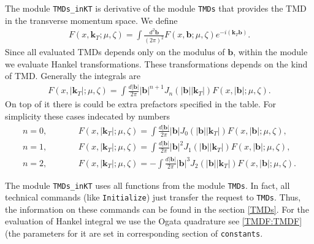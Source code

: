 \documentclass[prd,nofootinbib,eqsecnum,final]{revtex4}
\renewcommand{\(}{\left(}
\renewcommand{\)}{\right)}
\renewcommand{\[}{\left[}
\renewcommand{\]}{\right]}
\renewcommand{\vec}[1]{\bm{#1}}
\begin{document}
The module \texttt{TMDs\_inKT} is derivative of the module \texttt{TMDs} that provides the TMD in the transverse momentum space. We define
\begin{eqnarray}
F(x,\vec k_T;\mu,\zeta)=\int \frac{d^2\vec b}{(2\pi)^2}F(x,\vec b;\mu,\zeta)e^{-i(\vec k_T \vec b)}.
\end{eqnarray}
Since all evaluated TMDs depends only on the modulus of $\vec b$, within the module we evaluate Hankel transformations. These transformations depends on the kind of TMD. Generally the integrals are
\begin{eqnarray}\label{kT-J0}
F(x,|\vec k_T|;\mu,\zeta)=\int \frac{d|\vec b|}{2\pi}|\vec  b|^{n+1} J_n(|\vec b||\vec k_T|) F(x,|\vec b|;\mu,\zeta).
\end{eqnarray}
On top of it there is could be extra prefactors specified in the table. For simplicity these cases indecated by numbers
\begin{eqnarray}
n=0,&\qquad &F(x,|\vec k_T|;\mu,\zeta)=\int \frac{d|\vec b|}{2\pi}|\vec  b| J_0(|\vec b||\vec k_T|) F(x,|\vec b|;\mu,\zeta),
\\
n=1,&\qquad &F(x,|\vec k_T|;\mu,\zeta)=\int \frac{d|\vec b|}{2\pi}|\vec  b|^2 J_1(|\vec b||\vec k_T|) F(x,|\vec b|;\mu,\zeta),
\\
n=2,&\qquad &F(x,|\vec k_T|;\mu,\zeta)=-\int \frac{d|\vec b|}{2\pi}|\vec  b|^3 J_2(|\vec b||\vec k_T|) F(x,|\vec b|;\mu,\zeta).
\end{eqnarray}

The module \texttt{TMDs\_inKT} uses all functions from the module \texttt{TMDs}. In fact, all technical commands (like \texttt{Initialize}) just transfer the request to \texttt{TMDs}. Thus, the information on these commands can be found in the section \ref{TMDs}. For the evaluation of Hankel integral we use the Ogata quadrature see \ref{TMDF:TMDF} (the parameters for it are set in corresponding section of \texttt{constants}.
\end{document}

